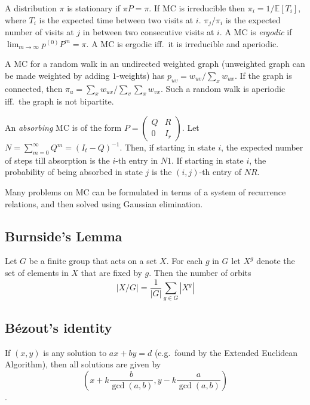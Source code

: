 \documentclass[9pt,a4paper,twocolumn,landscape,oneside]{amsart}
\begin{document}
        A distribution $\pi$ is stationary if $\pi P = \pi$. If MC is
        irreducible then $\pi_i = 1/\mathbb{E}[T_i]$, where $T_i$ is the
        expected time between two visits at $i$. $\pi_j/\pi_i$ is the expected
        number of visits at $j$ in between two consecutive visits at $i$. A MC
        is \textit{ergodic} if $\lim_{m\to\infty} p^{(0)} P^{m} = \pi$. A MC is
        ergodic iff.\ it is irreducible and aperiodic.

        A MC for a random walk in an undirected weighted graph (unweighted
        graph can be made weighted by adding $1$-weights) has $p_{uv} =
        w_{uv}/\sum_{x} w_{ux}$. If the graph is connected, then $\pi_u =
        \sum_{x} w_{ux} / \sum_{v}\sum_{x} w_{vx}$. Such a random walk is
        aperiodic iff.\ the graph is not bipartite.

        An \textit{absorbing} MC is of the form $P = \left(\begin{matrix} Q & R
        \\ 0 & I_r \end{matrix}\right)$. Let $N = \sum_{m=0}^\infty Q^m = (I_t
        - Q)^{-1}$. Then, if starting in state $i$, the expected number of
        steps till absorption is the $i$-th entry in $N1$. If starting in state
        $i$, the probability of being absorbed in state $j$ is the $(i,j)$-th
        entry of $NR$.

        Many problems on MC can be formulated in terms of a system of
        recurrence relations, and then solved using Gaussian elimination.

    \subsection{Burnside's Lemma}
        Let $G$ be a finite group that acts on a set $X$. For each $g$ in $G$
        let $X^g$ denote the set of elements in $X$ that are fixed by $g$. Then
        the number of orbits \[ |X/G| = \frac{1}{|G|} \sum_{g\in G} |X^g| \]

    \subsection{Bézout's identity}
        If $(x,y)$ is any solution to $ax+by=d$ (e.g.\ found by the Extended
        Euclidean Algorithm), then all solutions are given by \[
        \left(x+k\frac{b}{\gcd(a,b)}, y-k\frac{a}{\gcd(a,b)}\right) \].
\end{document}
